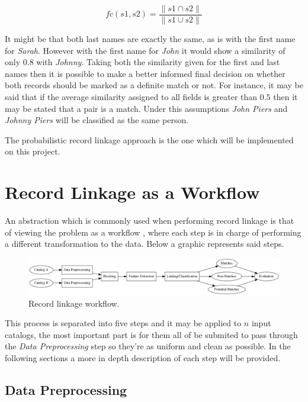 \documentclass[epsfig,a4paper,11pt,titlepage,twoside,openany]{book}
\begin{document}
$$
fc(s1, s2) = \frac{\| s1 \cap s2 \|}{\| s1 \cup s2 \|}
$$


It might be that both last names are exactly the same, as is with the first name for
\textit{Sarah}. However with the first name for \textit{John} it would show a similarity of only $0.8$ with \textit{Johnny}. Taking both the similarity given
for the first and last names then it is possible to make a better informed final decision on
whether both records should be marked as a definite match or not. 
For instance, it may be said that if the average similarity assigned to all fields is greater than $0.5$ then it may be stated that a pair is a match. Under this assumptions \textit{John Piers} and
\textit{Johnny Piers} will be classified as the same person.

The probabilistic record linkage approach is the one which will be implemented on this project.





\section{Record Linkage as a Workflow}
\label{sec:rl-as-a-workflow}

An abstraction which is commonly used when performing record linkage is that of viewing the problem as a workflow \cite{christen12_data}, where each step is in charge of performing a different transformation to the data. Below a graphic represents said steps.

\begin{figure}[H]
  \centering \includegraphics[width=\textwidth]{rl-workflow}
  \caption{Record linkage workflow.}
  \label{fig:rl-workflow}
\end{figure}

This process is separated into five steps and it may be applied to $n$ input catalogs, the most important part is for them all of be submited to pass through the \textit{Data Preprocessing} step so they're as uniform and clean as possible. In the following sections a more in depth description of each step will be provided.

\subsection{Data Preprocessing}
\label{sec:rl-workflow-data-preprocessing}
\end{document}
